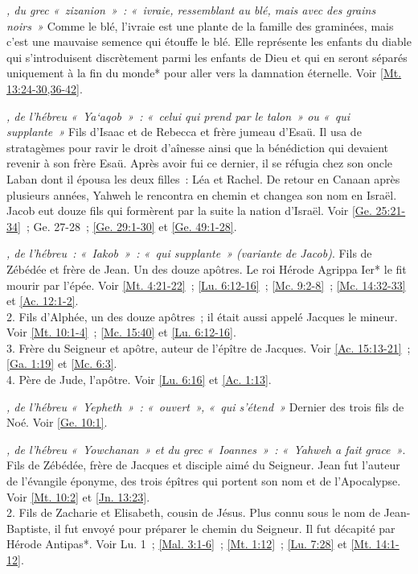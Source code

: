 \begin{multicols}{2}
\textit{, du grec «~zizanion~»~: «~ivraie, ressemblant au blé, mais avec des grains noirs~»}\newline
Comme le blé, l'ivraie est une plante de la famille des graminées, mais c'est une mauvaise semence qui étouffe le blé. Elle représente les enfants du diable qui s'introduisent discrètement parmi les enfants de Dieu et qui en seront séparés uniquement à la fin du monde* pour aller vers la damnation éternelle. Voir \vref{Mt. 13:24-30,36-42}.

\textit{, de l'hébreu «~Ya`aqob~»~: «~celui qui prend par le talon~» ou «~qui supplante~»}\newline
Fils d'Isaac et de Rebecca et frère jumeau d'Esaü. Il usa de stratagèmes pour ravir le droit d'aînesse ainsi que la bénédiction qui devaient revenir à son frère Esaü. Après avoir fui ce dernier, il se réfugia chez son oncle Laban dont il épousa les deux filles~: Léa et Rachel. De retour en Canaan après plusieurs années, Yahweh le rencontra en chemin et changea son nom en Israël. Jacob eut douze fils qui formèrent par la suite la nation d'Israël.\newline
Voir \vref{Ge. 25:21-34}~; Ge. 27-28~; \vref{Ge. 29:1-30} et \vref{Ge. 49:1-28}.

\textit{, de l'hébreu~: «~Iakob~»~: «~qui supplante~» (variante de Jacob)}. Fils de Zébédée et frère de Jean. Un des douze apôtres. Le roi Hérode Agrippa Ier* le fit mourir par l'épée. Voir \vref{Mt. 4:21-22}~; \vref{Lu. 6:12-16}~; \vref{Mc. 9:2-8}~; \vref{Mc. 14:32-33} et \vref{Ac. 12:1-2}.
\\2. Fils d'Alphée, un des douze apôtres~; il était aussi appelé Jacques le mineur. Voir \vref{Mt. 10:1-4}~; \vref{Mc. 15:40} et \vref{Lu. 6:12-16}.
\\3. Frère du Seigneur et apôtre, auteur de l'épître de Jacques. Voir \vref{Ac. 15:13-21}~; \vref{Ga. 1:19} et \vref{Mc. 6:3}.
\\4. Père de Jude, l'apôtre. Voir \vref{Lu. 6:16} et \vref{Ac. 1:13}.

\textit{, de l'hébreu «~Yepheth~»~: «~ouvert~», «~qui s'étend~»}\newline
Dernier des trois fils de Noé. Voir \vref{Ge. 10:1}.

\textit{, de l'hébreu «~Yowchanan~» et du grec «~Ioannes~»~: «~Yahweh a fait grace~»}. Fils de Zébédée, frère de Jacques et disciple aimé du Seigneur. Jean fut l'auteur de l'évangile éponyme, des trois épîtres qui portent son nom et de l'Apocalypse. Voir \vref{Mt. 10:2} et \vref{Jn. 13:23}.
\\2. Fils de Zacharie et Elisabeth, cousin de Jésus. Plus connu sous le nom de Jean-Baptiste, il fut envoyé pour préparer le chemin du Seigneur. Il fut décapité par Hérode Antipas*.\newline
Voir Lu. 1~; \vref{Mal. 3:1-6}~; \vref{Mt. 1:12}~; \vref{Lu. 7:28} et \vref{Mt. 14:1-12}.


\end{multicols}
